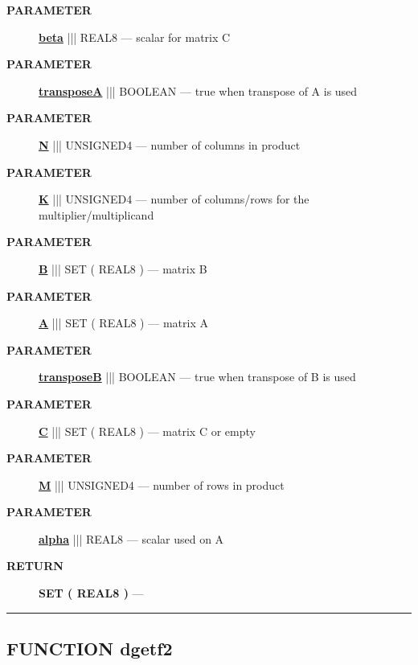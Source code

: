 \par
\begin{description}
\item [\colorbox{tagtype}{\color{white} \textbf{\textsf{PARAMETER}}}] \textbf{\underline{beta}} ||| REAL8 --- scalar for matrix C
\item [\colorbox{tagtype}{\color{white} \textbf{\textsf{PARAMETER}}}] \textbf{\underline{transposeA}} ||| BOOLEAN --- true when transpose of A is used
\item [\colorbox{tagtype}{\color{white} \textbf{\textsf{PARAMETER}}}] \textbf{\underline{N}} ||| UNSIGNED4 --- number of columns in product
\item [\colorbox{tagtype}{\color{white} \textbf{\textsf{PARAMETER}}}] \textbf{\underline{K}} ||| UNSIGNED4 --- number of columns/rows for the multiplier/multiplicand
\item [\colorbox{tagtype}{\color{white} \textbf{\textsf{PARAMETER}}}] \textbf{\underline{B}} ||| SET ( REAL8 ) --- matrix B
\item [\colorbox{tagtype}{\color{white} \textbf{\textsf{PARAMETER}}}] \textbf{\underline{A}} ||| SET ( REAL8 ) --- matrix A
\item [\colorbox{tagtype}{\color{white} \textbf{\textsf{PARAMETER}}}] \textbf{\underline{transposeB}} ||| BOOLEAN --- true when transpose of B is used
\item [\colorbox{tagtype}{\color{white} \textbf{\textsf{PARAMETER}}}] \textbf{\underline{C}} ||| SET ( REAL8 ) --- matrix C or empty
\item [\colorbox{tagtype}{\color{white} \textbf{\textsf{PARAMETER}}}] \textbf{\underline{M}} ||| UNSIGNED4 --- number of rows in product
\item [\colorbox{tagtype}{\color{white} \textbf{\textsf{PARAMETER}}}] \textbf{\underline{alpha}} ||| REAL8 --- scalar used on A
\end{description}







\par
\begin{description}
\item [\colorbox{tagtype}{\color{white} \textbf{\textsf{RETURN}}}] \textbf{SET ( REAL8 )} --- 
\end{description}




\rule{\linewidth}{0.5pt}
\subsection*{\textsf{\colorbox{headtoc}{\color{white} FUNCTION}
dgetf2}}

